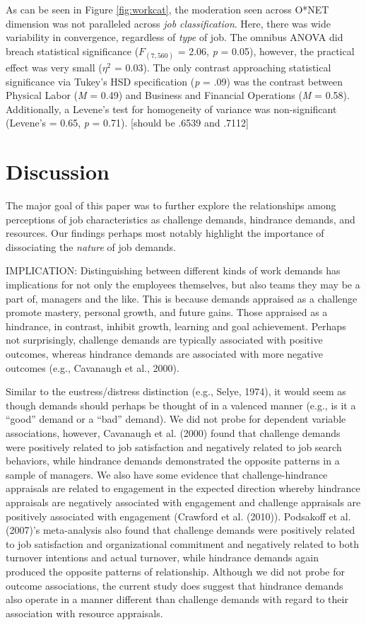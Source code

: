 \documentclass[
  man]{apa6}
\begin{document}
As can be seen in Figure \ref{fig:workcat}, the moderation seen across O*NET dimension was not paralleled across \emph{job classification}. Here, there was wide variability in convergence, regardless of \emph{type} of job. The omnibus ANOVA did breach statistical significance (\(F_{(7, 560)}\) = 2.06, \emph{p} = 0.05), however, the practical effect was very small (\(\eta^2\) = 0.03). The only contrast approaching statistical significance via Tukey's HSD specification (\emph{p} = .09) was the contrast between Physical Labor (\emph{M} = 0.49) and Business and Financial Operations (\emph{M} = 0.58). Additionally, a Levene's test for homogeneity of variance was non-significant (Levene's = 0.65, \emph{p} = 0.71). {[}should be .6539 and .7112{]}

\hypertarget{discussion}{%
\section{Discussion}\label{discussion}}

The major goal of this paper was to further explore the relationships among perceptions of job characteristics as challenge demands, hindrance demands, and resources. Our findings perhaps most notably highlight the importance of dissociating the \emph{nature} of job demands.

IMPLICATION: Distinguishing between different kinds of work demands has implications for not only the employees themselves, but also teams they may be a part of, managers and the like. This is because demands appraised as a challenge promote mastery, personal growth, and future gains. Those appraised as a hindrance, in contrast, inhibit growth, learning and goal achievement. Perhaps not surprisingly, challenge demands are typically associated with positive outcomes, whereas hindrance demands are associated with more negative outcomes (e.g., Cavanaugh et al., 2000).

Similar to the eustress/distress distinction (e.g., Selye, 1974), it would seem as though demands should perhaps be thought of in a valenced manner (e.g., is it a ``good'' demand or a ``bad'' demand). We did not probe for dependent variable associations, however, Cavanaugh et al. (2000) found that challenge demands were positively related to job satisfaction and negatively related to job search behaviors, while hindrance demands demonstrated the opposite patterns in a sample of managers. We also have some evidence that challenge-hindrance appraisals are related to engagement in the expected direction whereby hindrance appraisals are negatively associated with engagement and challenge appraisals are positively associated with engagement (Crawford et al. (2010)). Podsakoff et al. (2007)'s meta-analysis also found that challenge demands were positively related to job satisfaction and organizational commitment and negatively related to both turnover intentions and actual turnover, while hindrance demands again produced the opposite patterns of relationship. Although we did not probe for outcome associations, the current study does suggest that hindrance demands also operate in a manner different than challenge demands with regard to their association with resource appraisals.
\end{document}
